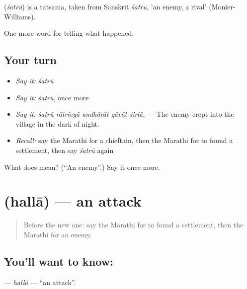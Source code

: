 \begin{cousinweb}
\textbf{} (\emph{śatrū}) is a tatsama, taken from Sanskrit \emph{śatru}, 'an enemy, a rival' (Monier-Williams).
\end{cousinweb}

\begin{grammarlens}[title={What you've built}]
One more word for telling what happened.
\end{grammarlens}

\subsection*{Your turn}
\begin{itemize}
\raggedright
  \item \emph{Say it:} \emph{śatrū}
  \item \emph{Say it:} \emph{śatrū}, once more
  \item \emph{Say it:} \emph{śatrū rātrīcyā andhārāt gāvāt śirlā.} — The enemy crept into the village in the dark of night.
  \item \emph{Recall:} say the Marathi for a chieftain, then the Marathi for to found a settlement, then say \emph{śatrū} again
\end{itemize}

\begin{tcolorbox}[breakable,colback=teal!4,colframe=teal!35!black,title={Before you move on}]
What does  mean? (\textquotedblleft{}An enemy\textquotedblright{}.) Say it once more.
\end{tcolorbox}
\section[\texorpdfstring{\mr{हल्ला} (hallā)}{हल्ला (hallā)}]{ (hallā) — an attack}

\label{lesson:MR-C328-halla}



\begin{quote}
Before the new one: say the Marathi for to found a settlement, then the Marathi for an enemy.
\end{quote}

\subsection*{You'll want to know: }
\textbf{} — \emph{hallā} — \textquotedblleft{}an attack\textquotedblright{}.

